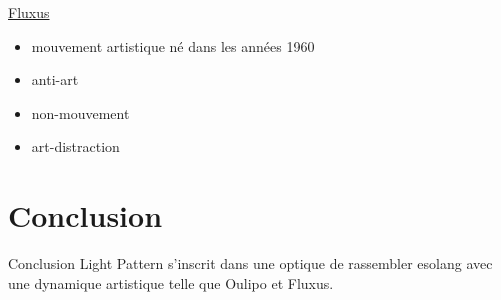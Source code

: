 \documentclass[xcolor={dvipsnames,svgnames}]{beamer}
\begin{document}
\begin{frame}
	\begin{block}{\href{https://fr.wikipedia.org/wiki/Fluxus}{Fluxus}}
		\begin{itemize}
			\item mouvement artistique né dans les années 1960
			\item anti-art
			\item non-mouvement
			\item art-distraction
		\end{itemize}
	\end{block}

\end{frame}

\section{Conclusion}
\begin{frame}{Conclusion}
	Light Pattern s'inscrit dans une optique de rassembler esolang avec une dynamique artistique telle que Oulipo et Fluxus.
\end{frame}
\end{document}

